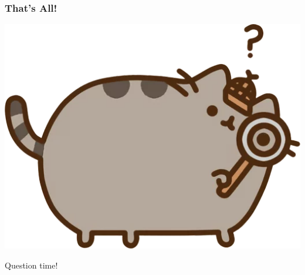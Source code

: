 \documentclass[UTF-8]{ctexbeamer}
\begin{document}
\begin{frame}
  \frametitle{That's All!}

  \begin{center}
    \includegraphics[width=.5\textwidth]{assets/look.png}

    Question time!
  \end{center}
\end{frame}
\end{document}
